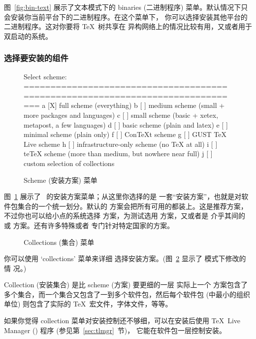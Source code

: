 \documentclass{article}
\begin{document}
图~\ref{fig:bin-text} 展示了文本模式下的 binaries (二进制程序)
菜单。默认情况下只会安装你当前平台下的二进制程序。在这个菜单下，
你可以选择安装其他平台的二进制程序。这对你要将 \TeX\ 树共享在
异构网络上的情况比较有用，又或者用于双启动的系统。

\subsubsection{选择要安装的组件}
\label{sec:components}

\begin{figure}[tbh]
\begin{boxedverbatim}
Select scheme:
===============================================================================
 a [X] full scheme (everything)
 b [ ] medium scheme (small + more packages and languages)
 c [ ] small scheme (basic + xetex, metapost, a few languages)
 d [ ] basic scheme (plain and latex)
 e [ ] minimal scheme (plain only)
 f [ ] ConTeXt scheme
 g [ ] GUST TeX Live scheme
 h [ ] infrastructure-only scheme (no TeX at all)
 i [ ] teTeX scheme (more than medium, but nowhere near full)
 j [ ] custom selection of collections
\end{boxedverbatim}
\caption{Scheme (安装方案) 菜单}\label{fig:scheme-text}
\end{figure}

图~\ref{fig:scheme-text} 展示了 \TL\ 的安装方案菜单；从这里你选择的是
一套``安装方案''，也就是对软件包集合的一个统一划分。默认的 
方案会把所有可用的都装上。这是推荐方案，不过你也可以给小点的系统选择
 方案，为测试选用  方案，又或者是
介乎其间的  或  方案。还有许多特殊或者
专门针对特定国家的方案。

\begin{figure}[tb]
\caption{Collections (集合) 菜单}\label{fig:collections-gui}
\end{figure}

你可以使用 `collections' 菜单来详细
选择安装方案。(图~\ref{fig:collections-gui} 显示了 \GUI 模式下修改的情
况。)

Collection (安装集合) 是比 scheme (方案) 要更细的一层 \Dash 实际上一个
方案包含了多个集合，而一个集合又包含了一到多个软件包，然后每个软件包
(\TL 中最小的组织单位) 则包含了实际的 \TeX\ 宏文件，字体文件，等等。

如果你觉得 collection 菜单对安装控制还不够细，可以在安装后使用
\TeX\ Live Manager () 程序 (参见第~\ref{sec:tlmgr}~节)，
它能在软件包一层控制安装。
\end{document}
